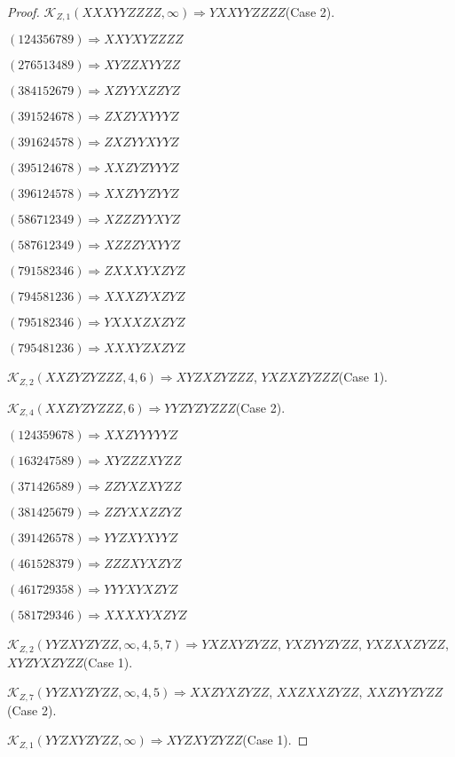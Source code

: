 \documentclass[12pt]{article}
\theoremstyle{plain}
\theoremstyle{definition}
\theoremstyle{remark}
\newcommand{\fancy}[1]{\mathcal{#1}}
\def\K{\fancy{K}}
\begin{document}
\begin{proof}
	$\K_{Z,1}(XXXYYZZZZ,\infty)\Rightarrow $$YXXYYZZZZ$(Case 2).
	
	
	
	$(1 2 4 3 5 6 7 8 9)\Rightarrow XXYXYZZZZ$
	
	$(2 7 6 5 1 3 4 8 9)\Rightarrow XYZZXYYZZ$
	
	$(3 8 4 1 5 2 6 7 9)\Rightarrow XZYYXZZYZ$
	
	$(3 9 1 5 2 4 6 7 8)\Rightarrow ZXZYXYYYZ$
	
	$(3 9 1 6 2 4 5 7 8)\Rightarrow ZXZYYXYYZ$
	
	$(3 9 5 1 2 4 6 7 8)\Rightarrow XXZYZYYYZ$
	
	$(3 9 6 1 2 4 5 7 8)\Rightarrow XXZYYZYYZ$
	
	$(5 8 6 7 1 2 3 4 9)\Rightarrow XZZZYYXYZ$
	
	$(5 8 7 6 1 2 3 4 9)\Rightarrow XZZZYXYYZ$
	
	$(7 9 1 5 8 2 3 4 6)\Rightarrow ZXXXYXZYZ$
	
	$(7 9 4 5 8 1 2 3 6)\Rightarrow XXXZYXZYZ$
	
	$(7 9 5 1 8 2 3 4 6)\Rightarrow YXXXZXZYZ$
	
	$(7 9 5 4 8 1 2 3 6)\Rightarrow XXXYZXZYZ$
	
	
	
	$\K_{Z,2}(XXZYZYZZZ,4, 6)\Rightarrow $$XYZXZYZZZ$, $YXZXZYZZZ$(Case 1).
	
	$\K_{Z,4}(XXZYZYZZZ,6)\Rightarrow $$YYZYZYZZZ$(Case 2).
	
	
	
	$(1 2 4 3 5 9 6 7 8)\Rightarrow XXZYYYYYZ$
	
	$(1 6 3 2 4 7 5 8 9)\Rightarrow XYZZZXYZZ$
	
	$(3 7 1 4 2 6 5 8 9)\Rightarrow ZZYXZXYZZ$
	
	$(3 8 1 4 2 5 6 7 9)\Rightarrow ZZYXXZZYZ$
	
	$(3 9 1 4 2 6 5 7 8)\Rightarrow YYZXYXYYZ$
	
	$(4 6 1 5 2 8 3 7 9)\Rightarrow ZZZXYXZYZ$
	
	$(4 6 1 7 2 9 3 5 8)\Rightarrow YYYXYXZYZ$
	
	$(5 8 1 7 2 9 3 4 6)\Rightarrow XXXXYXZYZ$
	
	
	
	$\K_{Z,2}(YYZXYZYZZ,\infty,4, 5, 7)\Rightarrow $$YXZXYZYZZ$, $YXZYYZYZZ$, $YXZXXZYZZ$, $XYZYXZYZZ$(Case 1).
	
	$\K_{Z,7}(YYZXYZYZZ,\infty,4, 5)\Rightarrow $$XXZYXZYZZ$, $XXZXXZYZZ$, $XXZYYZYZZ$(Case 2).
	
	$\K_{Z,1}(YYZXYZYZZ,\infty)\Rightarrow $$XYZXYZYZZ$(Case 1).
	

\end{proof}
\end{document}
